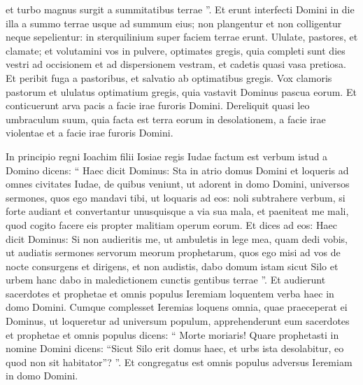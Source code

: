 \begin{biblechapter}
\begin{biblechapter}
\begin{biblechapter}
\begin{biblechapter}
\begin{biblechapter}
\begin{biblechapter}
\begin{biblechapter}
\begin{biblechapter}
\begin{biblechapter}
\begin{biblechapter}
\begin{biblechapter}
\begin{biblechapter}
\begin{biblechapter}
\begin{biblechapter}
\begin{biblechapter}
\begin{biblechapter}
\begin{biblechapter}
\begin{biblechapter}
\begin{biblechapter}
\begin{biblechapter}
\begin{biblechapter}
\begin{biblechapter}
\begin{biblechapter}
\begin{biblechapter}
\begin{biblechapter}
 et turbo magnus surgit a summitatibus terrae ”.
 \verse Et erunt interfecti Domini in die illa a summo terrae usque ad summum eius; non plangentur et non colligentur neque sepelientur: in sterquilinium super faciem terrae erunt.
 \verse Ululate, pastores, et clamate;
 et volutamini vos in pulvere, optimates gregis,
 quia completi sunt dies vestri ad occisionem
 et ad dispersionem vestram,
 et cadetis quasi vasa pretiosa.
 \verse Et peribit fuga a pastoribus,
 et salvatio ab optimatibus gregis.
 \verse Vox clamoris pastorum
 et ululatus optimatium gregis,
 quia vastavit Dominus pascua eorum.
 \verse Et conticuerunt arva pacis
 a facie irae furoris Domini.
 \verse Dereliquit quasi leo umbraculum suum,
 quia facta est terra eorum in desolationem,
 a facie irae violentae
 et a facie irae furoris Domini.
 
\begin{biblechapter}
\verse In principio regni Ioachim filii Iosiae regis Iudae factum est verbum istud a Domino dicens: 
\verse “ Haec dicit Dominus: Sta in atrio domus Domini et loqueris ad omnes civitates Iudae, de quibus veniunt, ut adorent in domo Domini, universos sermones, quos ego mandavi tibi, ut loquaris ad eos: noli subtrahere verbum, 
\verse si forte audiant et convertantur unusquisque a via sua mala, et paeniteat me mali, quod cogito facere eis propter malitiam operum eorum. 
\verse Et dices ad eos: Haec dicit Dominus: Si non audieritis me, ut ambuletis in lege mea, quam dedi vobis, 
\verse ut audiatis sermones servorum meorum prophetarum, quos ego misi ad vos de nocte consurgens et dirigens, et non audistis, 
\verse dabo domum istam sicut Silo et urbem hanc dabo in maledictionem cunctis gentibus terrae ”.
 \verse Et audierunt sacerdotes et prophetae et omnis populus Ieremiam loquentem verba haec in domo Domini. 
\verse Cumque complesset Ieremias loquens omnia, quae praeceperat ei Dominus, ut loqueretur ad universum populum, apprehenderunt eum sacerdotes et prophetae et omnis populus dicens: “ Morte moriaris! 
\verse Quare prophetasti in nomine Domini dicens: “Sicut Silo erit domus haec, et urbs ista desolabitur, eo quod non sit habitator”? ”.
 Et congregatus est omnis populus adversus Ieremiam in domo Domini. 

\end{biblechapter}
\end{biblechapter}
\end{biblechapter}
\end{biblechapter}
\end{biblechapter}
\end{biblechapter}
\end{biblechapter}
\end{biblechapter}
\end{biblechapter}
\end{biblechapter}
\end{biblechapter}
\end{biblechapter}
\end{biblechapter}
\end{biblechapter}
\end{biblechapter}
\end{biblechapter}
\end{biblechapter}
\end{biblechapter}
\end{biblechapter}
\end{biblechapter}
\end{biblechapter}
\end{biblechapter}
\end{biblechapter}
\end{biblechapter}
\end{biblechapter}
\end{biblechapter}
